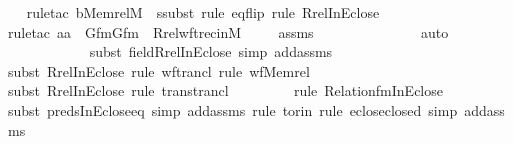 \begin{isabellebody}
%
\isadelimproof
\isanewline
\ \ %
\endisadelimproof
%
\isatagproof
{}\isamarkupfalse%
{\isacharparenleft}{\kern0pt}rule{\isacharunderscore}{\kern0pt}tac\ b{\isacharequal}{\kern0pt}{\isachardoublequoteopen}Memrel{\isacharparenleft}{\kern0pt}M{\isacharparenright}{\kern0pt}{\isacharcircum}{\kern0pt}{\isacharplus}{\kern0pt}{\isachardoublequoteclose}\ \ ssubst{\isacharcomma}{\kern0pt}\ rule\ eq{\isacharunderscore}{\kern0pt}flip{\isacharcomma}{\kern0pt}\ rule\ Rrel{\isacharunderscore}{\kern0pt}InEclose{\isacharparenright}{\kern0pt}\isanewline
\ \ \isamarkupfalse%
{\isacharparenleft}{\kern0pt}rule{\isacharunderscore}{\kern0pt}tac\ a{\isacharequal}{\kern0pt}a\ \ Gfm{\isacharequal}{\kern0pt}Gfm\ \ Rrel{\isacharunderscore}{\kern0pt}wftrec{\isacharunderscore}{\kern0pt}in{\isacharunderscore}{\kern0pt}M{\isacharparenright}{\kern0pt}\ \isanewline
\ \ \isamarkupfalse%
\ assms\isanewline
\ \ \ \ \ \ \ \ \ \ \ \ \ \isamarkupfalse%
\ auto{\isacharbrackleft}{\kern0pt}{}{\isacharbrackright}{\kern0pt}\isanewline
\ \ \ \ \ \ \ \ \ \ \ \isamarkupfalse%
{\isacharparenleft}{\kern0pt}subst\ field{\isacharunderscore}{\kern0pt}Rrel{\isacharunderscore}{\kern0pt}InEclose{\isacharcomma}{\kern0pt}\ simp\ add{\isacharcolon}{\kern0pt}assms{\isacharparenright}{\kern0pt}\isanewline
\ \ \ \ \ \ \ \ \ \ \isamarkupfalse%
{\isacharparenleft}{\kern0pt}subst\ Rrel{\isacharunderscore}{\kern0pt}InEclose{\isacharcomma}{\kern0pt}\ rule\ wf{\isacharunderscore}{\kern0pt}trancl{\isacharcomma}{\kern0pt}\ rule\ wf{\isacharunderscore}{\kern0pt}Memrel{\isacharparenright}{\kern0pt}\isanewline
\ \ \ \ \ \ \ \ \ \isamarkupfalse%
{\isacharparenleft}{\kern0pt}subst\ Rrel{\isacharunderscore}{\kern0pt}InEclose{\isacharcomma}{\kern0pt}\ rule\ trans{\isacharunderscore}{\kern0pt}trancl{\isacharparenright}{\kern0pt}\isanewline
\ \ \ \ \ \ \ \ \isamarkupfalse%
{\isacharparenleft}{\kern0pt}rule\ Relation{\isacharunderscore}{\kern0pt}fm{\isacharunderscore}{\kern0pt}InEclose{\isacharparenright}{\kern0pt}\isanewline
\ \ \ \ \ \ \ \isamarkupfalse%
{\isacharparenleft}{\kern0pt}subst\ preds{\isacharunderscore}{\kern0pt}InEclose{\isacharunderscore}{\kern0pt}eq{\isacharcomma}{\kern0pt}\ simp\ add{\isacharcolon}{\kern0pt}assms{\isacharcomma}{\kern0pt}\ rule\ to{\isacharunderscore}{\kern0pt}rin{\isacharcomma}{\kern0pt}\ rule\ eclose{\isacharunderscore}{\kern0pt}closed{\isacharcomma}{\kern0pt}\ simp\ add{\isacharcolon}{\kern0pt}assms{\isacharparenright}{\kern0pt}\isanewline

\end{isabellebody}
